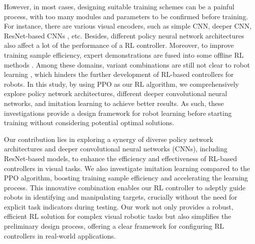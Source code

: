 \documentclass{article}
\begin{document}
However, in most cases, designing suitable training schemes can be a painful process, with too many modules and parameters to be confirmed before training. For instance, there are various visual encoders, such as simple CNN, deeper CNN, ResNet-based CNNs \cite{he2016deepresidual}, etc. Besides, different policy neural network architectures also affect a lot of the performance of a RL controller. Moreover, to improve training sample efficiency, expert demonstrations are fused into some offline RL methods \cite{kober2010imitation}. Among these domains, variant combinations are still not clear to robot learning \cite{ravichandar2020recent}, which hinders the further development of RL-based controllers for robots. In this study, by using PPO as our RL algorithm, we comprehensively explore policy network architectures, different deeper convolutional neural networks, and imitation learning to achieve better results. As such, these investigations provide a design framework for robot learning before starting training without considering potential optimal solutions.





Our contribution lies in exploring a synergy of diverse policy network architectures and deeper convolutional neural networks (CNNs), including ResNet-based models, to enhance the efficiency and effectiveness of RL-based controllers in visual tasks. We also investigate imitation learning compared to the PPO algorithm, boosting training sample efficiency and accelerating the learning process. This innovative combination enables our RL controller to adeptly guide robots in identifying and manipulating targets, crucially without the need for explicit task indicators during testing. Our work not only provides a robust, efficient RL solution for complex visual robotic tasks but also simplifies the preliminary design process, offering a clear framework for configuring RL controllers in real-world applications.
\end{document}
